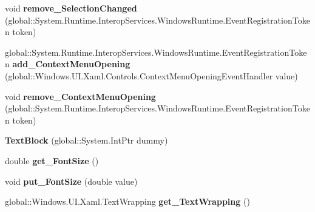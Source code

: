 \begin{DoxyCompactItemize}
void {\bfseries remove\+\_\+\+Selection\+Changed} (global\+::\+System.\+Runtime.\+Interop\+Services.\+Windows\+Runtime.\+Event\+Registration\+Token token)
\item 
\mbox{\label{class_windows_1_1_u_i_1_1_xaml_1_1_controls_1_1_text_block_abe06af10f87317e305ba6d841b08607c}} 
global\+::\+System.\+Runtime.\+Interop\+Services.\+Windows\+Runtime.\+Event\+Registration\+Token {\bfseries add\+\_\+\+Context\+Menu\+Opening} (global\+::\+Windows.\+U\+I.\+Xaml.\+Controls.\+Context\+Menu\+Opening\+Event\+Handler value)
\item 
\mbox{\label{class_windows_1_1_u_i_1_1_xaml_1_1_controls_1_1_text_block_ac298be0da72f4c9f2a436c5949a660d7}} 
void {\bfseries remove\+\_\+\+Context\+Menu\+Opening} (global\+::\+System.\+Runtime.\+Interop\+Services.\+Windows\+Runtime.\+Event\+Registration\+Token token)
\item 
\mbox{\label{class_windows_1_1_u_i_1_1_xaml_1_1_controls_1_1_text_block_a626ff976bc29fd838fa655f97f2533b0}} 
{\bfseries Text\+Block} (global\+::\+System.\+Int\+Ptr dummy)
\item 
\mbox{\label{class_windows_1_1_u_i_1_1_xaml_1_1_controls_1_1_text_block_ae396cab368662cf3d314b4c8cf21d51b}} 
double {\bfseries get\+\_\+\+Font\+Size} ()
\item 
\mbox{\label{class_windows_1_1_u_i_1_1_xaml_1_1_controls_1_1_text_block_a610333d337bf2e0cf5c901ca88ce3a21}} 
void {\bfseries put\+\_\+\+Font\+Size} (double value)
\item 
\mbox{\label{class_windows_1_1_u_i_1_1_xaml_1_1_controls_1_1_text_block_a7e6fe2e6c2baed541c6ec98293bfde3e}} 
global\+::\+Windows.\+U\+I.\+Xaml.\+Text\+Wrapping {\bfseries get\+\_\+\+Text\+Wrapping} ()
\item 
\mbox{\label{class_windows_1_1_u_i_1_1_xaml_1_1_controls_1_1_text_block_ac924a5e979a26efc36bd609cb83b92d7}} 

\end{DoxyCompactItemize}
